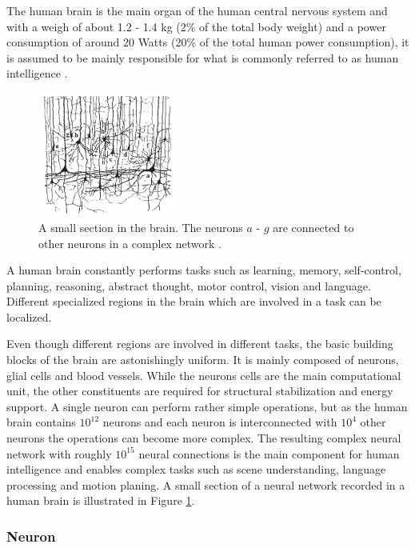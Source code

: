 The human brain is the main organ of the human central nervous system and with a weigh of about 1.2 - 1.4 kg (2\% of the total body weight) and a power consumption of around 20 Watts (20\% of the total human power consumption), it is assumed to be mainly responsible for what is commonly referred to as human intelligence \cite{gerstner2014neuronal}\cite{Byrne1997}.  

\begin{figure}
	\centering
    	\includegraphics[width=0.4\textwidth]{imgs/brain.png} 
    \caption[A small section in the brain.]{A small section in the brain. The neurons $a$ - $g$ are connected to other neurons in a complex network \cite{gerstner2014neuronal}.}
	\label{fig:brain}
\end{figure}

A human brain constantly performs tasks such as learning, memory, self-control, planning, reasoning, abstract thought, motor control, vision and language.
Different specialized regions in the brain which are involved in a task can be localized. 

Even though different regions are involved in different tasks, the basic building blocks of the brain are astonishingly uniform. 
It is mainly composed of neurons, glial cells and blood vessels.
While the neurons cells are the main computational unit, the other constituents are required for structural stabilization and energy support.
A single neuron can perform rather simple operations, but as the human brain contains $10^{12}$ neurons and each neuron is interconnected with $10^{4}$ other neurons the operations can become more complex.
The resulting complex neural network with roughly $10^{15}$ neural connections is the main component for human intelligence and enables complex tasks such as scene understanding, language processing and motion planing. A small section of a neural network recorded in a human brain is illustrated in Figure \ref{fig:brain}. 

\subsubsection{Neuron} \label{c:natneuron}

